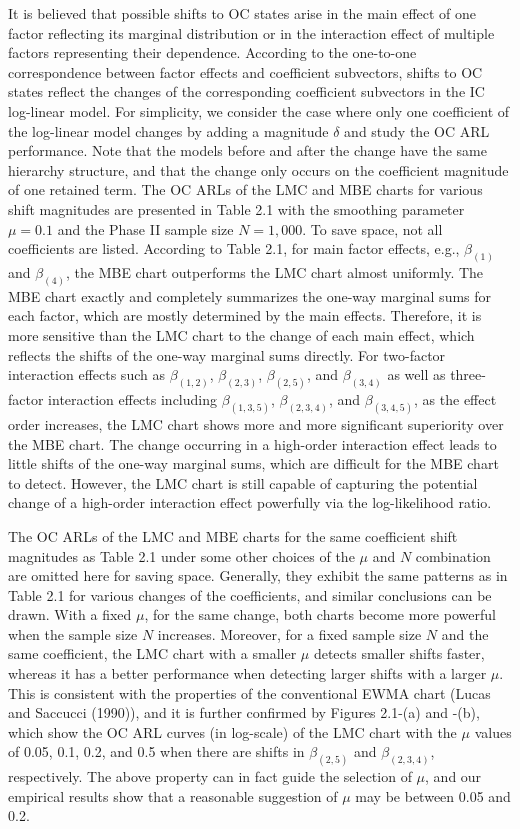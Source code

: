 It is believed that possible shifts to OC states arise in the main effect of one
factor reflecting its marginal distribution or in the interaction effect of multiple
factors representing their dependence. According to the one-to-one correspondence
between factor effects and coefficient subvectors, shifts to OC states reflect the
changes of the corresponding coefficient subvectors in the IC log-linear model. For
simplicity, we consider the case where only one coefficient of the log-linear model
changes by adding a magnitude $\delta$ and study the OC ARL performance. Note that
the models before and after the change have the same hierarchy structure, and that
the change only occurs on the coefficient magnitude of one retained term. The OC
ARLs of the LMC and MBE charts for various shift magnitudes are presented in Table
2.1 with the smoothing parameter $\mu=0.1$ and the Phase II sample size $N=1,000$.
To save space, not all coefficients are listed. According to Table 2.1, for main
factor effects, e.g., $\beta_{(1)}$ and $\beta_{(4)}$, the MBE chart outperforms the
LMC chart almost uniformly. The MBE chart exactly and completely summarizes the
one-way marginal sums for each factor, which are mostly determined by the main
effects. Therefore, it is more sensitive than the LMC chart to the change of each
main effect, which reflects the shifts of the one-way marginal sums directly. For
two-factor interaction effects such as $\beta_{(1,2)}$, $\beta_{(2,3)}$,
$\beta_{(2,5)}$, and $\beta_{(3,4)}$ as well as three-factor interaction effects
including $\beta_{(1,3,5)}$, $\beta_{(2,3,4)}$, and $\beta_{(3,4,5)}$, as the effect
order increases, the LMC chart shows more and more significant superiority over the
MBE chart. The change occurring in a high-order interaction effect leads to little
shifts of the one-way marginal sums, which are difficult for the MBE chart to
detect. However, the LMC chart is still capable of capturing the potential change of
a high-order interaction effect powerfully via the log-likelihood ratio.

The OC ARLs of the LMC and MBE charts for the same coefficient shift magnitudes as
Table 2.1 under some other choices of the $\mu$ and $N$ combination are omitted here
for saving space. Generally, they exhibit the same patterns as in Table 2.1 for
various changes of the coefficients, and similar conclusions can be drawn. With a
fixed $\mu$, for the same change, both charts become more powerful when the sample
size $N$ increases. Moreover, for a fixed sample size $N$ and the same coefficient,
the LMC chart with a smaller $\mu$ detects smaller shifts faster, whereas it has a
better performance when detecting larger shifts with a larger $\mu$. This is
consistent with the properties of the conventional EWMA chart (Lucas and Saccucci
(1990)), and it is further confirmed by Figures 2.1-(a) and -(b), which show the OC
ARL curves (in log-scale) of the LMC chart with the $\mu$ values of 0.05, 0.1, 0.2,
and 0.5 when there are shifts in $\beta_{(2,5)}$ and $\beta_{(2,3,4)}$,
respectively. The above property can in fact guide the selection of $\mu$, and our
empirical results show that a reasonable suggestion of $\mu$ may be between 0.05 and
0.2.



